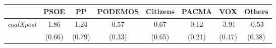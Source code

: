 \begin{table}[ht]
\centering
\begin{tabular}{lccccccc}
\hline
\hline
& PSOE & PP & PODEMOS & Citizens & PACMA & VOX & Others \\
\hline
\textit{coalXpost} & 1.86 & 1.24 & 0.57 & 0.67 & 0.12 & -3.91 & -0.53 \\
\textit{} & (0.66) & (0.79) & (0.33) & (0.65) & (0.21) & (0.47) & (0.38) \\
\hline
\hline
\end{tabular}
\end{table}